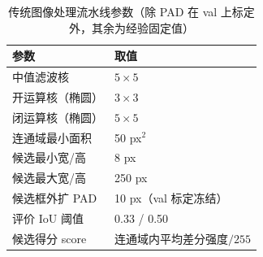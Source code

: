 \begin{table}[t]
\centering
\caption{传统图像处理流水线参数（除 PAD 在 val 上标定外，其余为经验固定值）}
\label{tab:ip_params}
\small
\begin{tabular}{ll}
\toprule
参数 & 取值 \\
\midrule
中值滤波核 & $5\times 5$ \\
开运算核（椭圆） & $3\times 3$ \\
闭运算核（椭圆） & $5\times 5$ \\
连通域最小面积 & 50 px$^2$ \\
候选最小宽/高 & 8 px \\
候选最大宽/高 & 250 px \\
候选框外扩 PAD & 10 px（val 标定冻结） \\
评价 IoU 阈值 & 0.33 / 0.50 \\
候选得分 score & 连通域内平均差分强度$/255$ \\
\bottomrule
\end{tabular}
\end{table}
